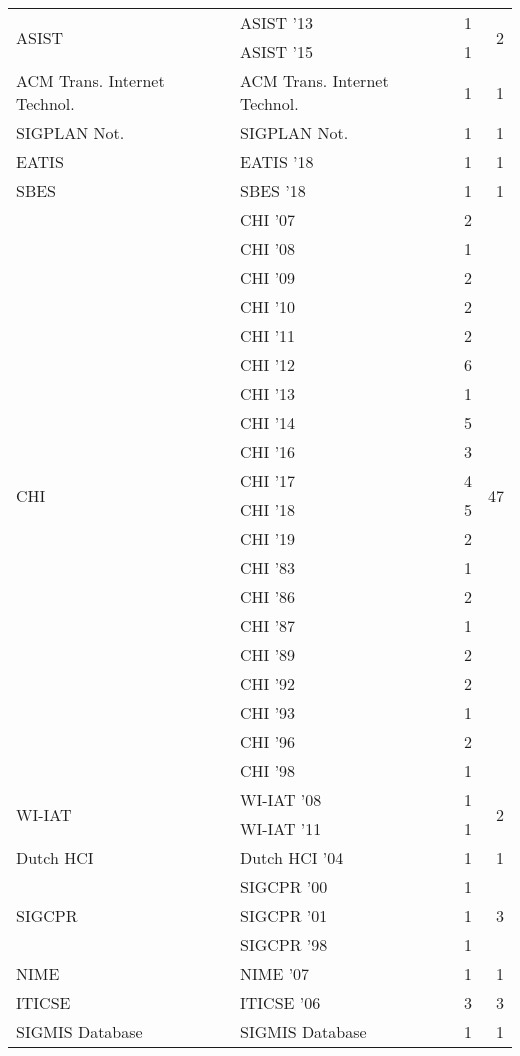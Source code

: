 \begin{table*}[t]
\begin{tabular}{llrr}
\multirow{2}{*}{ASIST } & ASIST '13 & 1 & \multirow{2}{*}{2}\\
& ASIST '15 & 1 &\\
\multirow{1}{*}{ACM Trans. Internet Technol.} & ACM Trans. Internet Technol. & 1 & \multirow{1}{*}{1}\\
\multirow{1}{*}{SIGPLAN Not.} & SIGPLAN Not. & 1 & \multirow{1}{*}{1}\\
\multirow{1}{*}{EATIS } & EATIS '18 & 1 & \multirow{1}{*}{1}\\
\multirow{1}{*}{SBES } & SBES '18 & 1 & \multirow{1}{*}{1}\\
\multirow{20}{*}{CHI } & CHI '07 & 2 & \multirow{20}{*}{47}\\
& CHI '08 & 1 &\\
& CHI '09 & 2 &\\
& CHI '10 & 2 &\\
& CHI '11 & 2 &\\
& CHI '12 & 6 &\\
& CHI '13 & 1 &\\
& CHI '14 & 5 &\\
& CHI '16 & 3 &\\
& CHI '17 & 4 &\\
& CHI '18 & 5 &\\
& CHI '19 & 2 &\\
& CHI '83 & 1 &\\
& CHI '86 & 2 &\\
& CHI '87 & 1 &\\
& CHI '89 & 2 &\\
& CHI '92 & 2 &\\
& CHI '93 & 1 &\\
& CHI '96 & 2 &\\
& CHI '98 & 1 &\\
\multirow{2}{*}{WI-IAT } & WI-IAT '08 & 1 & \multirow{2}{*}{2}\\
& WI-IAT '11 & 1 &\\
\multirow{1}{*}{Dutch HCI } & Dutch HCI '04 & 1 & \multirow{1}{*}{1}\\
\multirow{3}{*}{SIGCPR } & SIGCPR '00 & 1 & \multirow{3}{*}{3}\\
& SIGCPR '01 & 1 &\\
& SIGCPR '98 & 1 &\\
\multirow{1}{*}{NIME } & NIME '07 & 1 & \multirow{1}{*}{1}\\
\multirow{1}{*}{ITICSE } & ITICSE '06 & 3 & \multirow{1}{*}{3}\\
\multirow{1}{*}{SIGMIS Database} & SIGMIS Database & 1 & \multirow{1}{*}{1}\\

\end{tabular}
\end{table*}
